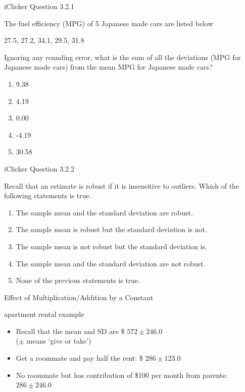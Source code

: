 \documentclass[14pt]{beamer}\usepackage[]{graphicx}\usepackage[]{color}
\begin{document}
\begin{frame}[fragile]{iClicker Question 3.2.1}

The fuel efficiency (MPG) of 5 Japanese made cars are listed below

27.5,	27.2,	34.1,	29.5,	31.8

Ignoring any rounding error, what is the sum of all the deviations (MPG  for Japanese made cars) from the mean MPG for Japanese made  cars?

\begin{enumerate}
\item 9.38
\item 4.19
\item 0.00
\item -4.19
\item 30.58
\end{enumerate}
\end{frame}

\begin{frame}[fragile]{iClicker Question 3.2.2}

Recall that an estimate is robust if it is insensitive to outliers. Which of  the following statements is true.

\begin{enumerate}
\item The sample mean and the standard deviation are robust.
\item The sample mean is robust but the standard deviation is  not.
\item The sample mean is not robust but the standard deviation  is.
\item The sample mean and the standard deviation are not  robust.
\item None of the previous statements is true.
\end{enumerate}
\end{frame}

\begin{frame}[fragile]{Effect of Multiplication/Addition by a Constant}



\begin{center}
apartment rental example
\end{center}

\begin{itemize}
\item<1-> Recall that the mean and SD are \$ $572 \pm 246.0$ \\ ($\pm$ means `give or take')
\item<2-> Get a roommate and pay half the rent: \$ $286 \pm 123.0$ %
\item<3-> No roommate but has contribution of \$100 per month from parents: $286 \pm 246.0$    %
\end{itemize}
\end{frame}
\end{document}
